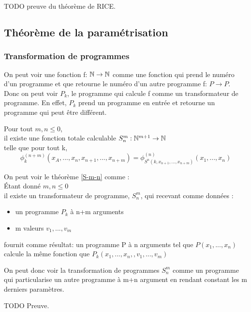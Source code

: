 TODO preuve du théorème de RICE.



\subsection{Théorème de la paramétrisation}
\label{sub:th_or_me_de_la_param_trisation}

\subsubsection{Transformation de programmes}
\label{ssub:transformation_de_programmes}
On peut voir une fonction f: $\mathbb{N} \rightarrow \mathbb{N}$ comme une fonction qui prend 
le numéro d'un programme et que retourne le numéro d'un autre programme f: $P 
\rightarrow P$. Donc on peut voir $P_k$, le programme qui calcule f comme un 
transformateur de programme. En effet, $P_k$ prend un programme en entrée et 
retourne un programme qui peut être différent.

\begin{mytheo}[S-m-n] 
	\label{S-m-n}Pour tout $m,n \leq 0$, \\
	il existe une fonction totale calculable $S^m_n : \mathbb{N}^{m+1} \rightarrow 
	\mathbb{N}$ \\
	telle que pour tout k,
	$$ \phi^{(n+m)}_k(x_A,...,x_n,x_{n+1},...,x_{n+m}) = 
	\phi^{(n)}_{S^n(k,x_{n+1}, ...,x_{n+m})} (x_1,...,x_n)$$
\end{mytheo}

\begin{myrem}
	On peut voir le théorème \ref{S-m-n} comme : \\
	Étant donné $m,n \leq 0$\\
	il existe un transformateur de programme, $S^m_n$, qui recevant comme 
	données : 
	\begin{itemize}
		\item un programme $P_k$ à n+m arguments
		\item m valeurs $v_1,...,v_m$
	\end{itemize}
	fournit comme résultat: un programme P à n arguments tel que 
	$P(x_1,...,x_n)$ calcule la même fonction que 
	$P_k(x_1,...,x_n,,v_1,...,v_m)$
\end{myrem}

\begin{myrem}
	On peut donc voir la transformation de programmes $S^m_n$ comme un 
	programme qui particularise un autre programme à m+n argument en rendant 
	constant les m derniers paramètres.
\end{myrem}
TODO Preuve.

